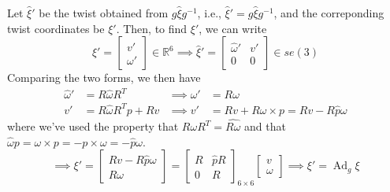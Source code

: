 Let \( \widehat{\xi}' \) be the twist obtained from \( g \widehat{\xi} g^{-1} \), i.e., \( \widehat{\xi}' = g \widehat{\xi} g^{-1} \), and the correponding twist coordinates be \( \xi' \).
Then, to find \( \xi' \), we can write
\begin{equation*}
    \xi'
    =
    \begin{bmatrix}
        v' \\
        \omega'
    \end{bmatrix}
    \in \mathbb{R}^{6}
    \implies
    \widehat{\xi}'
    =
    \begin{bmatrix}
        \widehat{\omega}' & v' \\
        0                 & 0
    \end{bmatrix}
    \in s e(3)
\end{equation*}
Comparing the two forms, we then have
\begin{align*}
    \widehat{\omega}'
     & =
    R \widehat{\omega} R^{T}
     &
    \implies
    \omega'
     & =
    R \omega
    \\
    v'
     & =
    R \widehat{\omega} R^{T} p + R v
     &
    \implies
    v'
     & =
    R v + R \omega \times p
    =
    R v - R \widehat{p} \omega
\end{align*}
where we've used the property that \( R \omega R^T = \widehat{R \omega} \) and that \( \widehat{\omega} p = \omega \times p = - p \times \omega = - \widehat{p} \omega \).
\begin{equation*}
    \implies
    \xi'
    =
    \begin{bmatrix}
        R v - R \widehat{p} \omega \\
        R \omega
    \end{bmatrix}
    =
    \begin{bmatrix}
        R & \widehat{p} R \\
        0 & R
    \end{bmatrix}_{6\times 6}
    \begin{bmatrix}
        v \\
        \omega
    \end{bmatrix}
    \implies
    \boxed{
        \xi'
        =
        \operatorname{Ad}_{g} \xi
    }
\end{equation*}
